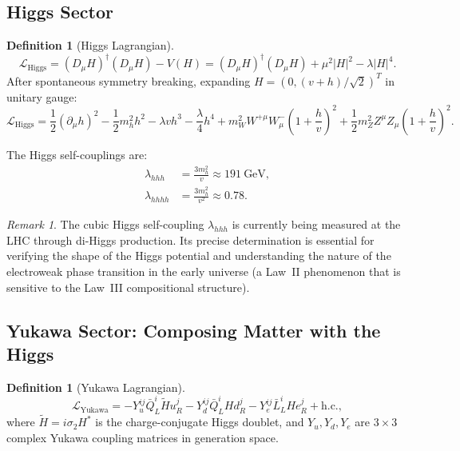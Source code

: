 \documentclass[12pt]{article}
\theoremstyle{definition}
\newtheorem{definition}[theorem]{Definition}
\theoremstyle{remark}
\newtheorem{remark}[theorem]{Remark}
\newcommand{\lag}{\mathcal{L}}
\newcommand{\dmu}{D_\mu}
\newcommand{\pmu}{\partial_\mu}
\begin{document}
\subsection{Higgs Sector}

\begin{definition}[Higgs Lagrangian]
\label{def:higgs-lagrangian}
\begin{equation}
\label{eq:higgs-lagrangian}
\lag_{\mathrm{Higgs}} = (\dmu H)^\dagger (\dmu H) - V(H) = (\dmu H)^\dagger (\dmu H) + \mu^2 |H|^2 - \lambda |H|^4.
\end{equation}
After spontaneous symmetry breaking, expanding $H = (0, (v+h)/\sqrt{2})^T$ in unitary gauge:
\begin{equation}
\lag_{\mathrm{Higgs}} = \frac{1}{2}(\pmu h)^2 - \frac{1}{2} m_h^2 h^2 - \lambda v h^3 - \frac{\lambda}{4} h^4 + m_W^2 W^{+\mu} W^-_\mu \left(1 + \frac{h}{v}\right)^2 + \frac{1}{2} m_Z^2 Z^\mu Z_\mu \left(1 + \frac{h}{v}\right)^2.
\end{equation}
\end{definition}

The Higgs self-couplings are:
\begin{align}
\lambda_{hhh} &= \frac{3 m_h^2}{v} \approx 191~\text{GeV}, \label{eq:cubic-higgs} \\
\lambda_{hhhh} &= \frac{3 m_h^2}{v^2} \approx 0.78. \label{eq:quartic-higgs}
\end{align}

\begin{remark}
The cubic Higgs self-coupling $\lambda_{hhh}$ is currently being measured at the LHC through di-Higgs production. Its precise determination is essential for verifying the shape of the Higgs potential and understanding the nature of the electroweak phase transition in the early universe (a Law~II phenomenon that is sensitive to the Law~III compositional structure).
\end{remark}

\subsection{Yukawa Sector: Composing Matter with the Higgs}

\begin{definition}[Yukawa Lagrangian]
\label{def:yukawa-lagrangian}
\begin{equation}
\label{eq:yukawa-lagrangian}
\lag_{\mathrm{Yukawa}} = -Y_u^{ij} \bar{Q}_L^i \tilde{H} u_R^j - Y_d^{ij} \bar{Q}_L^i H d_R^j - Y_e^{ij} \bar{L}_L^i H e_R^j + \text{h.c.},
\end{equation}
where $\tilde{H} = i\sigma_2 H^*$ is the charge-conjugate Higgs doublet, and $Y_u, Y_d, Y_e$ are $3 \times 3$ complex Yukawa coupling matrices in generation space.
\end{definition}
\end{document}
